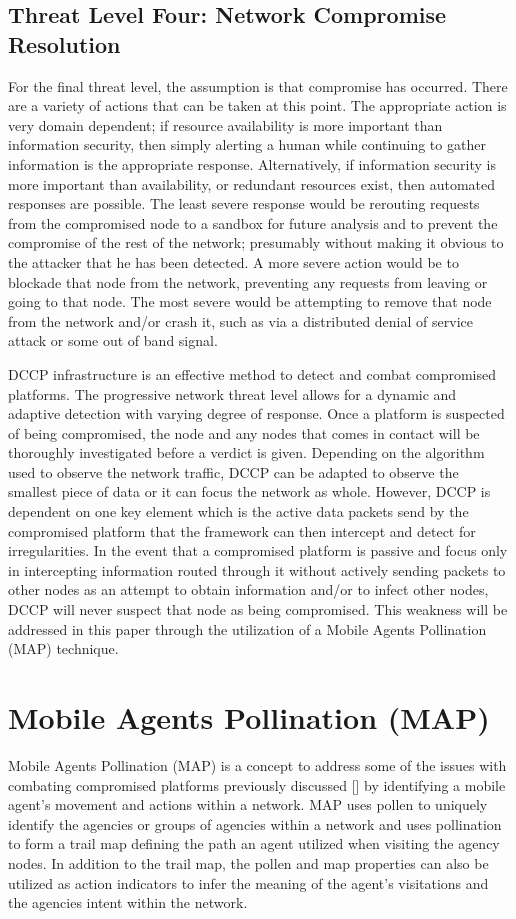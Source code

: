 \documentclass{acm_proc_article-sp}
\begin{document}
\subsection{Threat Level Four: Network Compromise Resolution}
For the final threat level, the assumption is that compromise has occurred.  There are a variety of actions that can be taken at this point.  The appropriate action is very domain dependent; if resource availability is more important than information security, then simply alerting a human while continuing to gather information is the appropriate response.  Alternatively, if information security is more important than availability, or redundant resources exist, then automated responses are possible.  The least severe response would be rerouting requests from the compromised node to a sandbox for future analysis and to prevent the compromise of the rest of the network; presumably without making it obvious to the attacker that he has been detected.  A more severe action would be to blockade that node from the network, preventing any requests from leaving or going to that node.  The most severe would be attempting to remove that node from the network and/or crash it, such as via a distributed denial of service attack or some out of band signal.  

DCCP infrastructure is an effective method to detect and combat compromised platforms. The progressive network threat level allows for a dynamic and adaptive detection with varying degree of response. Once a platform is suspected of being compromised, the node and any nodes that comes in contact will be thoroughly investigated before a verdict is given. Depending on the algorithm used to observe the network traffic, DCCP can be adapted to observe the smallest piece of data or it can focus the network as whole. However, DCCP is dependent on one key element which is the active data packets send by the compromised platform that the framework can then intercept and detect for irregularities. In the event that a compromised platform is passive and focus only in intercepting information routed through it without actively sending packets to other nodes as an attempt to obtain information and/or to infect other nodes, DCCP will never suspect that node as being compromised. This weakness will be addressed in this paper through the utilization of a Mobile Agents Pollination (MAP) technique. 

\section{Mobile Agents Pollination (MAP)}
Mobile Agents Pollination (MAP) is a concept to address some of the issues with combating compromised platforms previously discussed [] by identifying a mobile agent’s movement and actions within a network. MAP uses pollen to uniquely identify the agencies or groups of agencies within a network and uses pollination to form a trail map defining the path an agent utilized when visiting the agency nodes. In addition to the trail map, the pollen and map properties can also be utilized as action indicators to infer the meaning of the agent's visitations and the agencies intent within the network.
\end{document}
